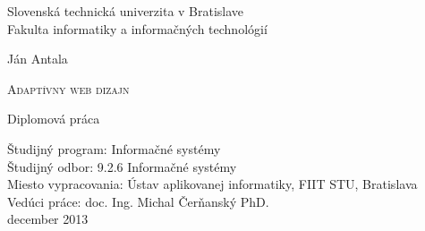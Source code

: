 

\setlength{\parindent}{0cm}

\thispagestyle{empty}

\begin{center}
\begin{LARGE}
\textmd{
Slovenská technická univerzita v Bratislave\\
\vspace*{0.2cm}
Fakulta informatiky a informačných technológií  
}
\end{LARGE}

\vspace*{1.0cm}
\begin{Large}
\end{Large}

\end{center}

\vspace{5.5cm}

\begin{center}
{\Large \textmd{{Ján Antala}}}
\end{center}

\vspace{0.1cm}
\begin{huge}
\begin{center}
\textsc{Adaptívny web dizajn}
\end{center}
\end{huge}

\vspace{0.5cm}
\begin{center}
{\Large{\textmd{Diplomová práca}}}\\
\end{center}

\vspace{5.5cm}

\begin{flushleft}
\large{Študijný program: Informačné systémy} \\
\large{Študijný odbor: 9.2.6 Informačné systémy} \\
\large{Miesto vypracovania:  Ústav aplikovanej informatiky, FIIT STU, Bratislava} \\
\large{Vedúci práce: doc. Ing. Michal Čerňanský PhD.} \\
\vspace{1.0cm}
\large{december 2013} \\
\end{flushleft}


